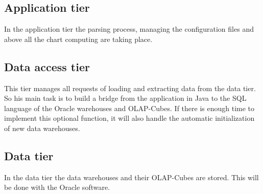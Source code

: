 \subsection{Application tier}
In the application tier the parsing process, managing the configuration files and above all 
the chart computing are taking place. 

\subsection{Data access tier}
This tier manages all requests of loading and extracting data from the data tier. So his main task is
to build a bridge from the application in Java to the SQL language of the Oracle warehouses and OLAP-Cubes.
If there is enough time to implement this optional function, it will also handle 
the automatic initialization of new data warehouses.  

\subsection{Data tier}
In the data tier the data warehouses and their OLAP-Cubes are stored. 
This will be done with the Oracle software.  
